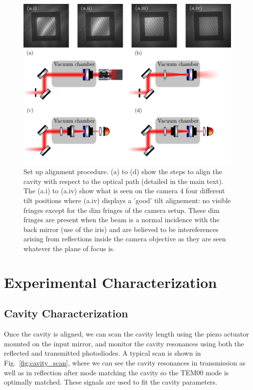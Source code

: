\begin{figure}[h!]
    \centering  
    \includegraphics[width=\textwidth]{./chap5/fig/tilt_alignementB.pdf}
    \caption{Set up alignment procedure. (a) to (d) show the steps to align the cavity with respect to the optical path (detailed in the main text). The (a.i) to (a.iv) show what is seen on the camera 4 four different tilt positions where (a.iv) displays a 'good' tilt alignement: no visible fringes except for the dim fringes of the camera setup. These dim fringes are present when the beam is a normal incidence with the back mirror (use of the iris) and are believed to be intereferences arising from reflections inside the camera objective as they are seen whatever the plane of focus is. }
    \label{fig:tilt}
\end{figure}
\section{Experimental Characterization}
\subsection{Cavity Characterization}
Once the cavity is aligned, we can scan the cavity length using the piezo actuator mounted on the input mirror, and monitor the cavity resonances using both the reflected and transmitted photodiodes. A typical scan is shown in Fig.~\ref{fig:cavity_scan}, where we can see the cavity resonances in transmission as well as in reflection after mode matching the cavity so the TEM00 mode is optimally matched. These signals are used to fit the cavity parameters. 

